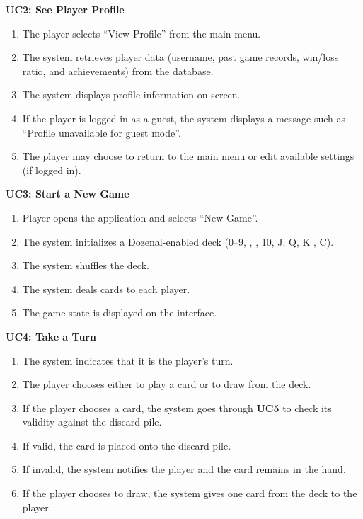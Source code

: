 \documentclass[12pt]{article}
\begin{document}
\noindent\textbf{UC2: See Player Profile}
\begin{enumerate}
    \item The player selects ``View Profile'' from the main menu.
    \item The system retrieves player data (username, past game records, win/loss ratio, and achievements) from the database.
    \item The system displays profile information on screen.
    \item If the player is logged in as a guest, the system displays a message such as ``Profile unavailable for guest mode''.
    \item The player may choose to return to the main menu or edit available settings (if logged in).
\end{enumerate}


\noindent\textbf{UC3: Start a New Game}
\begin{enumerate}
    \item Player opens the application and selects ``New Game''.
    \item The system initializes a Dozenal-enabled deck (0--9, , , 10, J, Q, K , C).
    \item The system shuffles the deck.
    \item The system deals cards to each player.
    \item The game state is displayed on the interface.
\end{enumerate}

\noindent\textbf{UC4: Take a Turn}
\begin{enumerate}
    \item The system indicates that it is the player’s turn.
    \item The player chooses either to play a card or to draw from the deck.
    \item If the player chooses a card, the system goes through \textbf{UC5} to check its validity against the discard pile.
    \item If valid, the card is placed onto the discard pile.
    \item If invalid, the system notifies the player and the card remains in the hand.
    \item If the player chooses to draw, the system gives one card from the deck to the player.
\end{enumerate}
\end{document}
